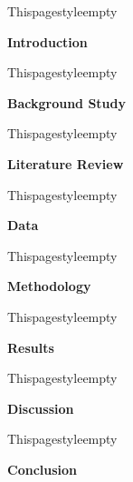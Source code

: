 \documentclass[12pt,a4paper]{article}
\newcommand{\SectionDivider}[1]{%
  \clearpage
  	Thispagestyle{empty}%
  \begin{center}
    \vspace*{0.35\textheight}
    {\Huge\bfseries #1}\par
  \end{center}
  \clearpage
}
\begin{document}







\newpage
\tableofcontents

\newpage
\listoffigures

\newpage
\listoftables

\newpage
{}

\SectionDivider{Introduction}


\SectionDivider{Background Study}


\SectionDivider{Literature Review}


\SectionDivider{Data}


\SectionDivider{Methodology}


\SectionDivider{Results}


\SectionDivider{Discussion}


\SectionDivider{Conclusion}





\end{document}
